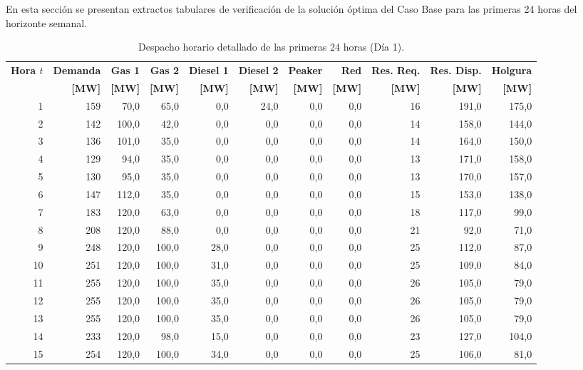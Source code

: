 \documentclass[10pt,letterpaper]{article}
\begin{document}
En esta sección se presentan extractos tabulares de verificación de la solución óptima del Caso Base para las primeras 24 horas del horizonte semanal.

\begin{table}[H]
\centering
\caption{Despacho horario detallado de las primeras 24 horas (Día 1).}
\label{tab:anexo_dia1}
\setlength{\tabcolsep}{3.5pt}
\footnotesize
\begin{tabular}{rrrrrrrrrrr}
\toprule
\textbf{Hora $t$} & \textbf{Demanda} & \textbf{Gas 1} & \textbf{Gas 2} & \textbf{Diesel 1} & \textbf{Diesel 2} & \textbf{Peaker} & \textbf{Red} & \textbf{Res. Req.} & \textbf{Res. Disp.} & \textbf{Holgura} \\
& \textbf{[MW]} & \textbf{[MW]} & \textbf{[MW]} & \textbf{[MW]} & \textbf{[MW]} & \textbf{[MW]} & \textbf{[MW]} & \textbf{[MW]} & \textbf{[MW]} & \textbf{[MW]} \\
\midrule
1 & 159 & 70,0 & 65,0 & 0,0 & 24,0 & 0,0 & 0,0 & 16 & 191,0 & 175,0 \\
2 & 142 & 100,0 & 42,0 & 0,0 & 0,0 & 0,0 & 0,0 & 14 & 158,0 & 144,0 \\
3 & 136 & 101,0 & 35,0 & 0,0 & 0,0 & 0,0 & 0,0 & 14 & 164,0 & 150,0 \\
4 & 129 & 94,0 & 35,0 & 0,0 & 0,0 & 0,0 & 0,0 & 13 & 171,0 & 158,0 \\
5 & 130 & 95,0 & 35,0 & 0,0 & 0,0 & 0,0 & 0,0 & 13 & 170,0 & 157,0 \\
6 & 147 & 112,0 & 35,0 & 0,0 & 0,0 & 0,0 & 0,0 & 15 & 153,0 & 138,0 \\
7 & 183 & 120,0 & 63,0 & 0,0 & 0,0 & 0,0 & 0,0 & 18 & 117,0 & 99,0 \\
8 & 208 & 120,0 & 88,0 & 0,0 & 0,0 & 0,0 & 0,0 & 21 & 92,0 & 71,0 \\
9 & 248 & 120,0 & 100,0 & 28,0 & 0,0 & 0,0 & 0,0 & 25 & 112,0 & 87,0 \\
10 & 251 & 120,0 & 100,0 & 31,0 & 0,0 & 0,0 & 0,0 & 25 & 109,0 & 84,0 \\
11 & 255 & 120,0 & 100,0 & 35,0 & 0,0 & 0,0 & 0,0 & 26 & 105,0 & 79,0 \\
12 & 255 & 120,0 & 100,0 & 35,0 & 0,0 & 0,0 & 0,0 & 26 & 105,0 & 79,0 \\
13 & 255 & 120,0 & 100,0 & 35,0 & 0,0 & 0,0 & 0,0 & 26 & 105,0 & 79,0 \\
14 & 233 & 120,0 & 98,0 & 15,0 & 0,0 & 0,0 & 0,0 & 23 & 127,0 & 104,0 \\
15 & 254 & 120,0 & 100,0 & 34,0 & 0,0 & 0,0 & 0,0 & 25 & 106,0 & 81,0 \\

\end{tabular}
\end{table}
\end{document}

